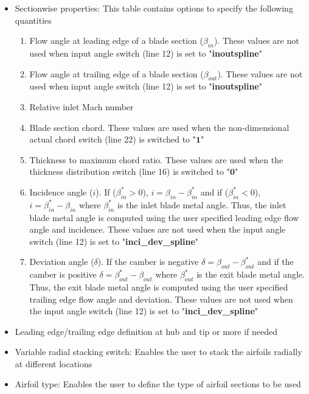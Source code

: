 \documentclass[8pt]{article}
\begin{document}
\begin{itemize}[leftmargin=*]
\begin{enumerate}[label=\alph*]
\begin{itemize}[label=\FilledSmallSquare]
        \end{itemize}
    \end{enumerate} 
    \item Sectionwise properties: This table contains options to specify the following quantities
    \begin{enumerate}[label=\alph*]
        \item Flow angle at leading edge of a blade section ($\beta_{in}$). These values are not used when input angle switch (line 12) is set to "\textbf{inoutspline}"
        \item Flow angle at trailing edge of a blade section ($\beta_{out}$). These values are not used when input angle switch (line 12) is set to "\textbf{inoutspline}"
        \item Relative inlet Mach number 
        \item Blade section chord. These values are used when the non-dimensional actual chord switch (line 22) is switched to "$\mathbf{1}$"
        \item Thickness to maximum chord ratio. These values are used when the thickness distribution switch (line 16) is switched to "$\mathbf{0}$"
        \item Incidence angle ($i$). If ($\beta_{in}^{*} > 0$), $i = \beta_{in} - \beta_{in}^{*}$ and if ($\beta_{in}^{*} < 0$), $i = \beta_{in}^{*} - \beta_{in}$ where $\beta_{in}^{*}$ is the inlet blade metal angle. Thus, the inlet blade metal angle is computed using the user specified leading edge flow angle and incidence. These values are not used when the input angle switch (line 12) is set to "\textbf{inci\_dev\_spline}"
        \item Deviation angle ($\delta$). If the camber is negative $\delta = \beta_{out} - \beta_{out}^{*}$ and if the camber is positive $\delta = \beta_{out}^{*} - \beta_{out}$ where $\beta_{out}^{*}$ is the exit blade metal angle. Thus, the exit blade metal angle is computed using the user specified trailing edge flow angle and deviation. These values are not used when the input angle switch (line 12) is set to "\textbf{inci\_dev\_spline}"
    \end{enumerate}
    \item Leading edge/trailing edge definition at hub and tip or more if needed
    \item Variable radial stacking switch: Enables the user to stack the airfoils radially at different locations
    \item Airfoil type: Enables the user to define the type of airfoil sections to be used

\end{itemize}
\end{document}
